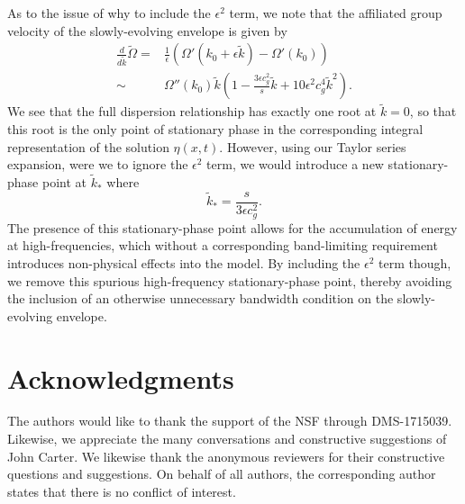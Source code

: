 \documentclass[a4paper,11pt]{article}
\begin{document}
As to the issue of why to include the $\epsilon^{2}$ term, we note that the affiliated group velocity of the slowly-evolving envelope is given by 
\begin{align*}
\frac{d}{d\tilde{k}}\tilde{\Omega} = & \frac{1}{\epsilon}\left(\Omega'(k_{0}+\epsilon \tilde{k}) - \Omega'(k_{0})\right)\\
\sim & \Omega''(k_{0})\tilde{k}\left(1 - \frac{3\epsilon c_{g}^{2}}{s}\tilde{k} + 10 \epsilon^{2}c_{g}^{4}\tilde{k}^{2}\right).
\end{align*}
We see that the full dispersion relationship has exactly one root at $\tilde{k}=0$, so that this root is the only point of stationary phase in the corresponding integral representation of the solution $\eta(x,t)$.  However, using our Taylor series expansion, were we to ignore the $\epsilon^{2}$ term, we would introduce a new stationary-phase point at $\tilde{k}_{\ast}$ where
\[
\tilde{k}_{\ast} = \frac{s}{3\epsilon c_{g}^{2}}.
\]
The presence of this stationary-phase point allows for the accumulation of energy at high-frequencies, which without a corresponding band-limiting requirement introduces non-physical effects into the model.  By including the $\epsilon^{2}$ term though, we remove this spurious high-frequency stationary-phase point, thereby avoiding the inclusion of an otherwise unnecessary bandwidth condition on the slowly-evolving envelope.

\section*{Acknowledgments}
The authors would like to thank the support of the NSF through DMS-1715039.  Likewise, we appreciate the many conversations and constructive suggestions of John Carter.  We likewise thank the anonymous reviewers for their constructive questions and suggestions.  On behalf of all authors, the corresponding author states that there is no conflict of interest.

\pagebreak


\end{document}

